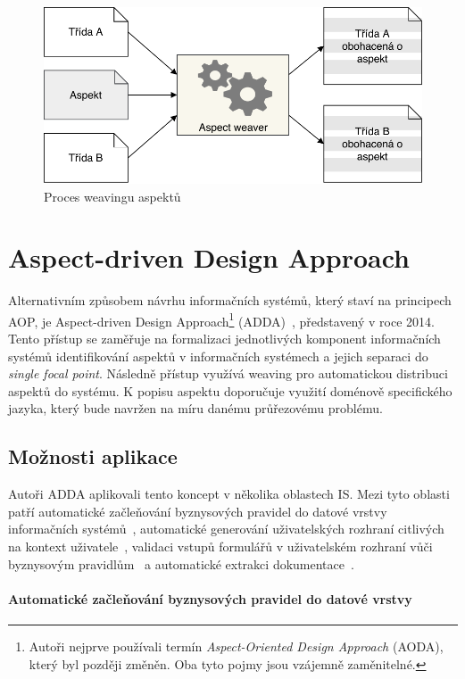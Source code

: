 \begin{figure}[t]
    \centering
    \includegraphics[keepaspectratio=true, width=0.7\linewidth]{figures/aspect-weaving.pdf}
    \caption{Proces weavingu aspektů}
    \label{fig:aspect-weaving}
\end{figure}

\section{Aspect-driven Design Approach}

Alternativním způsobem návrhu informačních systémů, který staví na principech \gls{AOP},
je Aspect-driven Design Approach\footnote{Autoři nejprve používali termín \textit{Aspect-Oriented
Design Approach} (AODA), který byl později změněn. Oba tyto pojmy jsou vzájemně zaměnitelné.}
(\gls{ADDA})~\cite{cemus2014aspect}, představený v roce 2014.
Tento přístup se zaměřuje na formalizaci jednotlivých komponent informačních systémů identifikování aspektů
v informačních systémech a jejich separaci do \textit{single focal point}.
Následně přístup využívá weaving pro automatickou distribuci aspektů do systému.
K popisu aspektu doporučuje využití doménově specifického jazyka, který bude navržen na
míru danému průřezovému problému.

\subsection{Možnosti aplikace}

Autoři \gls{ADDA} aplikovali tento koncept v několika oblastech \gls{IS}.
Mezi tyto oblasti patří automatické začleňování byznysových pravidel
do datové vrstvy informačních systémů~\cite{cemus2015automated}, automatické
generování uživatelských rozhraní citlivých na kontext uživatele~\cite{cemus2017separation},
validaci vstupů formulářů v uživatelském rozhraní vůči byznysovým pravidlům~\cite{cemus2016context}\cite{cemus2017separation}
a automatické extrakci dokumentace~\cite{cemus2017automated}.

\paragraph{Automatické začleňování byznysových pravidel do datové vrstvy}

